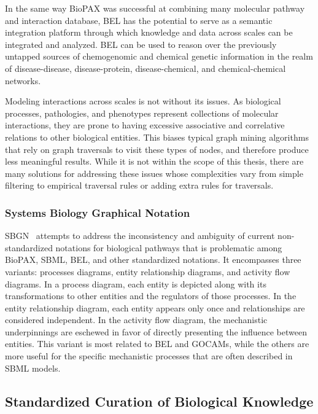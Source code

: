 In the same way \ac{BioPAX} was successful at combining many molecular pathway and interaction database, \ac{BEL} has the potential to serve as a semantic integration platform through which knowledge and data across scales can be integrated and analyzed.
\ac{BEL} can be used to reason over the previously untapped sources of chemogenomic and chemical genetic information in the realm of disease-disease, disease-protein, disease-chemical, and chemical-chemical networks.

Modeling interactions across scales is not without its issues.
As biological processes, pathologies, and phenotypes represent collections of molecular interactions, they are prone to having excessive associative and correlative relations to other biological entities.
This biases typical graph mining algorithms that rely on graph traversals to visit these types of nodes, and therefore produce less meaningful results.
While it is not within the scope of this thesis, there are many solutions for addressing these issues whose complexities vary from simple filtering to empirical traversal rules or adding extra rules for traversals.

\subsubsection{Systems Biology Graphical Notation}

\ac{SBGN}~\cite{LeNovere2009} attempts to address the inconsistency and ambiguity of current non-standardized notations for biological pathways that is problematic among \ac{BioPAX}, \ac{SBML}, \ac{BEL}, and other standardized notations.
It encompasses three variants: processes diagrams, entity relationship diagrams, and activity flow diagrams.
In a process diagram, each entity is depicted along with its transformations to other entities and the regulators of those processes.
In the entity relationship diagram, each entity appears only once and relationships are considered independent.
In the activity flow diagram, the mechanistic underpinnings are eschewed in favor of directly presenting the influence between entities.
This variant is most related to \ac{BEL} and \acp{GOCAM}, while the others are more useful for the specific mechanistic processes that are often described in \ac{SBML} models.

\subsection{Standardized Curation of Biological Knowledge}

